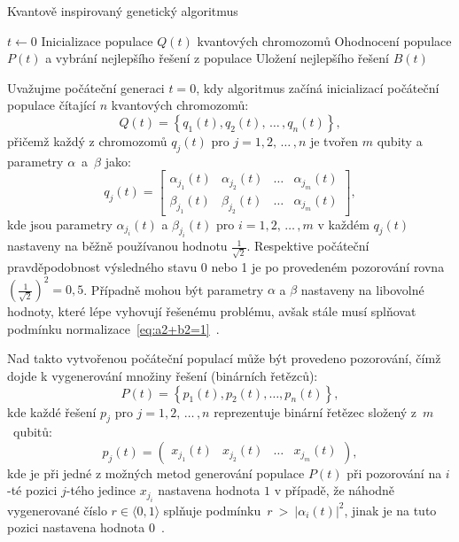 \begin{algorithm}[H]
    \caption{Kvantově inspirovaný genetický algoritmus~\cite{NaturalComputing}}
    \label{alg:BinaryQIEA}
    $t \gets 0$\;
    Inicializace populace $Q(t)$ kvantových chromozomů\;
    Ohodnocení populace $P(t)$ a vybrání nejlepšího řešení z populace\;
    Uložení nejlepšího řešení $B(t)$\;
\end{algorithm}
\noindent
Uvažujme počáteční generaci $t=0$, kdy algoritmus začíná inicializací počáteční populace čítající $n$ kvantových chromozomů:
\begin{equation*}
    Q(t) = \left\{ q_1(t), q_2(t),\,\dots\,, q_n(t) \right\},
\end{equation*}
přičemž každý z chromozomů $q_j(t)$ pro $j = 1,2,\,\dots\,,n$ je tvořen $m$ qubity a parametry $\alpha$~a~$\beta$ jako:
\begin{equation*}
    q_j(t) =
    \begin{bmatrix}
        \alpha_{j_1}(t) & \alpha_{j_2}(t) & \dots & \alpha_{j_m}(t) \\
        \beta_{j_1}(t)  & \beta_{j_2}(t)  & \dots & \alpha_{j_m}(t)
    \end{bmatrix},
\end{equation*}
kde jsou parametry $\alpha_{j_i}(t)$ a $\beta_{j_i}(t)$ pro $i = 1,2,\,\dots\,,m$ v každém $q_j(t)$ nastaveny na běžně používanou hodnotu $\frac{1}{\sqrt{2}}$. 
Respektive počáteční pravděpodobnost výsledného stavu 0 nebo 1 je po provedeném pozorování rovna $\left(\frac{1}{\sqrt{2}}\right)^2 = 0,5$. 
Případně mohou být parametry $\alpha$ a $\beta$ nastaveny na libovolné hodnoty, které lépe vyhovují řešenému problému, avšak stále musí splňovat podmínku normalizace~\ref{eq:a2+b2=1}~\cite{NaturalComputing,qiga}. 

Nad takto vytvořenou počáteční populací může být provedeno pozorování, čímž dojde k vygenerování množiny řešení (binárních řetězců):
\begin{equation*}
    P(t) = \left\{ p_1(t), p_2(t), \dots, p_n(t) \right\},
\end{equation*}
kde každé řešení $p_j$ pro $j = 1, 2,\,\dots\,, n$ reprezentuje binární řetězec složený z~$m$~qubitů:
\begin{equation*}
    p_j(t) = 
    \begin{pmatrix}
        x_{j_1}(t) & x_{j_2}(t) & \dots & x_{j_m}(t)
    \end{pmatrix},
\end{equation*}
kde je při jedné z možných metod generování populace $P(t)$ při pozorování na $i$-té pozici $j$-tého jedince $x_{j_{i}}$ nastavena hodnota $1$ v případě, že náhodně vygenerované číslo $r \in \langle 0, 1\rangle$ splňuje podmínku~$r~>~\left| \alpha_i(t) \right|^2$, jinak je na tuto pozici nastavena hodnota $0$~\cite{NaturalComputing,qiga}.

